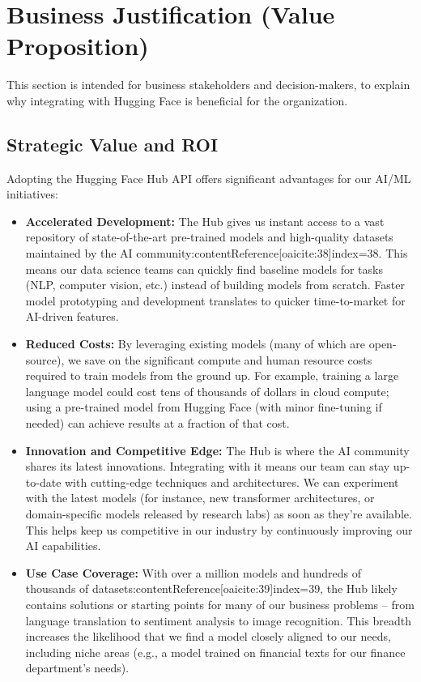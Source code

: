 \documentclass{article}
\begin{document}
\vspace{1em} %

\section{Business Justification (Value Proposition)}
This section is intended for business stakeholders and decision-makers, to explain why integrating with Hugging Face is beneficial for the organization.

\subsection*{Strategic Value and ROI}
Adopting the Hugging Face Hub API offers significant advantages for our AI/ML initiatives:
\begin{itemize}
    \item \textbf{Accelerated Development:} The Hub gives us instant access to a vast repository of state-of-the-art pre-trained models and high-quality datasets maintained by the AI community:contentReference[oaicite:38]{index=38}. This means our data science teams can quickly find baseline models for tasks (NLP, computer vision, etc.) instead of building models from scratch. Faster model prototyping and development translates to quicker time-to-market for AI-driven features.
    \item \textbf{Reduced Costs:} By leveraging existing models (many of which are open-source), we save on the significant compute and human resource costs required to train models from the ground up. For example, training a large language model could cost tens of thousands of dollars in cloud compute; using a pre-trained model from Hugging Face (with minor fine-tuning if needed) can achieve results at a fraction of that cost.
    \item \textbf{Innovation and Competitive Edge:} The Hub is where the AI community shares its latest innovations. Integrating with it means our team can stay up-to-date with cutting-edge techniques and architectures. We can experiment with the latest models (for instance, new transformer architectures, or domain-specific models released by research labs) as soon as they’re available. This helps keep us competitive in our industry by continuously improving our AI capabilities.
    \item \textbf{Use Case Coverage:} With over a million models and hundreds of thousands of datasets:contentReference[oaicite:39]{index=39}, the Hub likely contains solutions or starting points for many of our business problems – from language translation to sentiment analysis to image recognition. This breadth increases the likelihood that we find a model closely aligned to our needs, including niche areas (e.g., a model trained on financial texts for our finance department’s needs).

\end{itemize}
\end{document}

